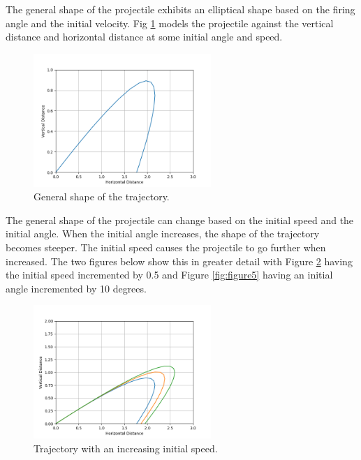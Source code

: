 \documentclass[12pt]{iopart} %
\begin{document}
The general shape of the projectile exhibits an elliptical shape based on the firing angle and the initial velocity. 
Fig \ref{fig:figure3} models the projectile against the vertical distance and horizontal distance at some initial angle and speed.

\begin{figure}[h!tbp]
  \begin{center}
 \item[]\includegraphics[width=0.6\textwidth]{figure3.png}
  \caption{\label{fig:figure3}
  General shape of the trajectory.
  }
  \end{center}
\end{figure}

The general shape of the projectile can change based on the initial speed and the initial angle. 
When the initial angle increases, the shape of the trajectory becomes steeper. 
The initial speed causes the projectile to go further when increased. 
The two figures below show this in greater detail with Figure \ref{fig:figure4} having the initial speed incremented by 0.5 and Figure \ref{fig:figure5} having an initial angle incremented by 10 degrees.

\begin{figure}[h!tbp]
  \begin{center}
 \item[]\includegraphics[width=0.6\textwidth]{figure4.png}
  \caption{\label{fig:figure4}
  Trajectory with an increasing initial speed.
  }
  \end{center}
\end{figure}
\end{document}

